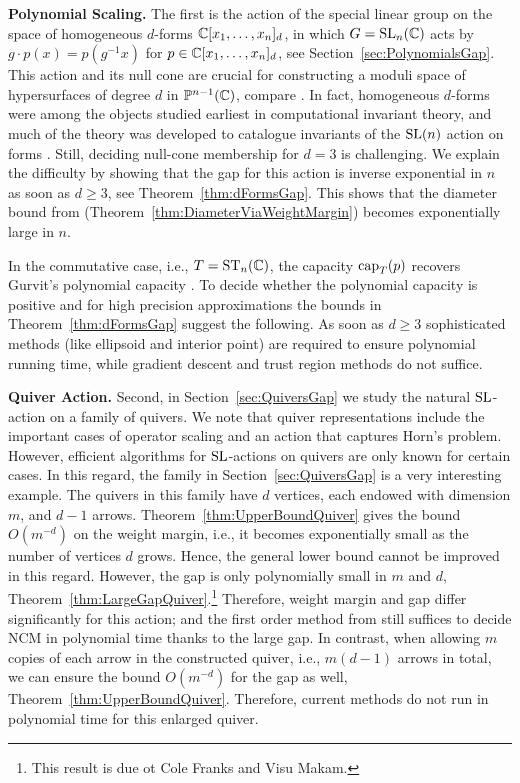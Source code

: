 \textbf{Polynomial Scaling.}
The first is the action of the special linear group on the space of homogeneous $d$-forms $\mathbb C[x_1, \dots, x_n]_d$, in which $G = \operatorname{SL}_n(\mathbb C)$ acts by $g \cdot p (x) = p (g^{-1} x)$ for $p \in \mathbb C[x_1, \dots, x_n]_d$, see Section~\ref{sec:PolynomialsGap}.  This action and its null cone are crucial for constructing a moduli space of hypersurfaces of degree $d$ in $\mathbb P^{n-1}(\mathbb C)$, compare \cite[Section~7]{hoskinsLectureModuli}.
In fact, homogeneous $d$-forms were among the objects studied earliest in computational invariant theory, and much of the theory was developed to catalogue invariants of the $\operatorname{SL}(n)$ action on forms \cite{weyl1946classical}. Still, deciding null-cone membership for $d = 3$ is challenging. We explain the difficulty by showing that the gap for this action is inverse exponential in $n$ as soon as $d \geq 3$, see Theorem~\ref{thm:dFormsGap}. This shows that the diameter bound from \cite{GradflowArXiv} (Theorem~\ref{thm:DiameterViaWeightMargin}) becomes exponentially large in $n$.

In the commutative case, i.e., $T = \operatorname{ST}_n(\mathbb C)$, the capacity $\operatorname{cap}_T(p)$ recovers Gurvit's polynomial capacity \cite{gurvits2004combinatorial, gurvits2006hyperbolic}. To decide whether the polynomial capacity is positive and for high precision approximations the bounds in Theorem~\ref{thm:dFormsGap} suggest the following. As soon as $d \geq 3$ sophisticated methods (like ellipsoid and interior point) are required to ensure polynomial running time, while gradient descent and trust region methods do not suffice.

\textbf{Quiver Action.}
Second,  in Section~\ref{sec:QuiversGap} we study the natural $\operatorname{SL}$-action on a family of quivers. We note that quiver representations include the important cases of operator scaling and an action that captures Horn's problem. However, efficient algorithms for $\operatorname{SL}$-actions on quivers are only known for certain cases. In this regard, the family in Section~\ref{sec:QuiversGap} is a very interesting example. The quivers in this family have $d$ vertices, each endowed with dimension $m$, and $d-1$ arrows. Theorem~\ref{thm:UpperBoundQuiver} gives the bound $O(m^{-d})$ on the weight margin, i.e., it becomes exponentially small as the number of vertices $d$ grows. Hence, the general lower bound \cite[Theorem~6.24 Item~2]{GradflowArXiv} cannot be improved in this regard. However, the gap is only polynomially small in $m$ and $d$, Theorem~\ref{thm:LargeGapQuiver}.\footnote{This result is due ot Cole Franks and Visu Makam.}
Therefore, weight margin and gap differ significantly for this action; and the first order method from \cite{GradflowArXiv} still suffices to decide NCM in polynomial time thanks to the large gap.
In contrast, when allowing $m$ copies of each arrow in the constructed quiver, i.e., $m(d-1)$ arrows in total, we can ensure the bound $O(m^{-d})$ for the gap as well, Theorem~\ref{thm:UpperBoundQuiver}. Therefore, current methods do not run in polynomial time for this enlarged quiver.



